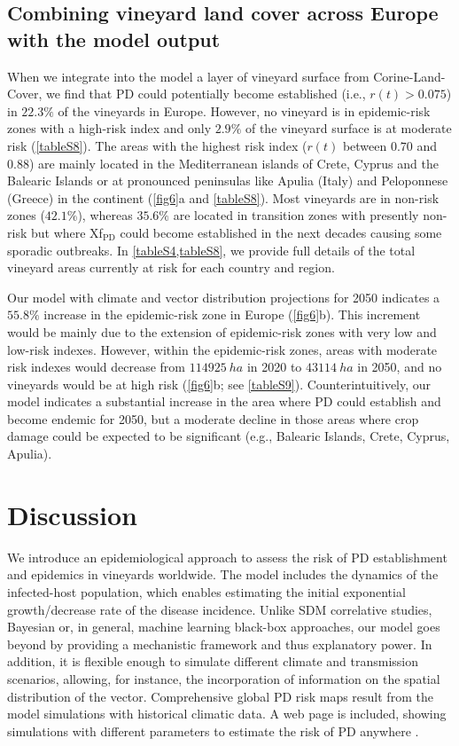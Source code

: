     \subsection{Combining vineyard land cover across Europe with the model
        output}
    When we integrate into the model a layer of vineyard surface from
    Corine-Land-Cover, we find that PD could potentially become established
    (i.e.,
$r(t)>0.075$) in $22.3\%$ of the vineyards in Europe. However, no vineyard is
    in epidemic-risk zones with a high-risk index and only $2.9\%$ of the
    vineyard surface is at moderate risk (\cref{tableS8}). The areas with the
    highest risk index ($r(t)$ between $0.70$ and $0.88$) are mainly located in
    the Mediterranean islands of Crete, Cyprus and the Balearic Islands or at
    pronounced peninsulas like Apulia (Italy) and Peloponnese (Greece) in the
    continent (\cref{fig6}a and \cref{tableS8}).  Most vineyards are in
    non-risk zones ($42.1\%$), whereas $35.6\%$ are located in transition zones
    with presently non-risk but where Xf$_{\textrm{PD}}$ could become
    established in the next decades causing some sporadic outbreaks. In
    \cref{tableS4,tableS8}, we provide full details of the total vineyard
    areas currently at risk for each country and region.

    Our model with climate and vector distribution projections for 2050
    indicates a $ 55.8 \% $ increase in the epidemic-risk zone in Europe
    (\cref{fig6}b). This increment would be mainly due to the extension of
    epidemic-risk zones with very low and low-risk indexes. However, within the
    epidemic-risk zones, areas with moderate risk indexes would decrease from
$\SI{114925}{ha}$ in 2020 to $\SI{43114}{ha}$ in 2050, and no vineyards would
    be at high risk (\cref{fig6}b; see \cref{tableS9}). Counterintuitively,
    our model indicates a substantial increase in the area where PD could
    establish and become endemic for 2050, but a moderate decline in those
    areas where crop damage could be expected to be significant (e.g., Balearic
    Islands, Crete, Cyprus, Apulia).

    \section{Discussion}

    We introduce an epidemiological approach to assess the risk of PD
    establishment and epidemics in vineyards worldwide. The model includes the
    dynamics of the infected-host population, which enables estimating the
    initial exponential growth/decrease rate of the disease incidence. Unlike
    SDM correlative studies, Bayesian or, in general, machine learning
    black-box approaches, our model goes beyond by providing a mechanistic
    framework and thus explanatory power. In addition, it is flexible enough to
    simulate different climate and transmission scenarios, allowing, for
    instance, the incorporation of information on the spatial distribution of
    the vector. Comprehensive global PD risk maps result from the model
    simulations with historical climatic data. A web page is included, showing
    simulations with different parameters to estimate the risk of PD anywhere
    \cite{Webpage}.

